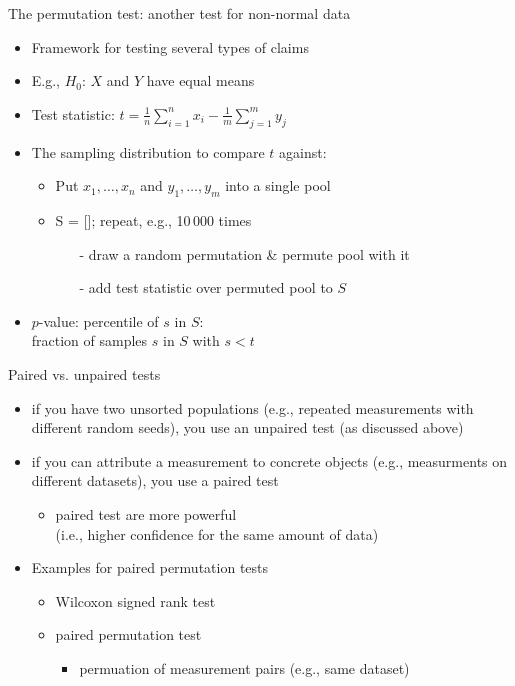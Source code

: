 \begin{frame}[c]{The permutation test: another test for non-normal data}

\begin{itemize}
	\item Framework for testing several types of claims
	\item E.g., $H_0$: $X$ and $Y$ have \alert{equal means}
	\item Test statistic: \alert{$t = \frac{1}{n}\sum_{i=1}^n x_i  - 
		\frac{1}{m}\sum_{j=1}^m y_j$}
	\pause
	\medskip
	\item The sampling distribution to compare $t$ against:
	\begin{itemize}
		\item Put $x_1, \dots, x_n$ and $y_1, \dots, y_m$ into a single pool
		\item S = []; repeat, e.g., 10\,000 times
		\begin{itemize}
			\item[-] draw a random permutation \& permute pool with it
			\item[-] add test statistic over permuted pool to $S$
		\end{itemize}
	\end{itemize}
	\pause
	\medskip
	\item $p$-value: percentile of $s$ in $S$:\\
	fraction of samples $s$ in $S$ with $s < t$
	
\end{itemize}

\end{frame}
\begin{frame}[c]{Paired vs. unpaired tests}

\begin{itemize}
	\item if you have two unsorted populations (e.g., repeated measurements with different random seeds), you use an unpaired test (as discussed above)
	\item if you can attribute a measurement to concrete objects (e.g., measurments on different datasets), you use a paired test
	\begin{itemize}
		\item paired test are more powerful\\
		(i.e., higher confidence for the same amount of data)
	\end{itemize}
    \item Examples for paired permutation tests
    \begin{itemize}
    	\item Wilcoxon signed rank test
    	\item paired permutation test
    	\begin{itemize}
    		\item permuation of measurement pairs (e.g., same dataset)
    	\end{itemize}
    \end{itemize}
\end{itemize}

\end{frame}
